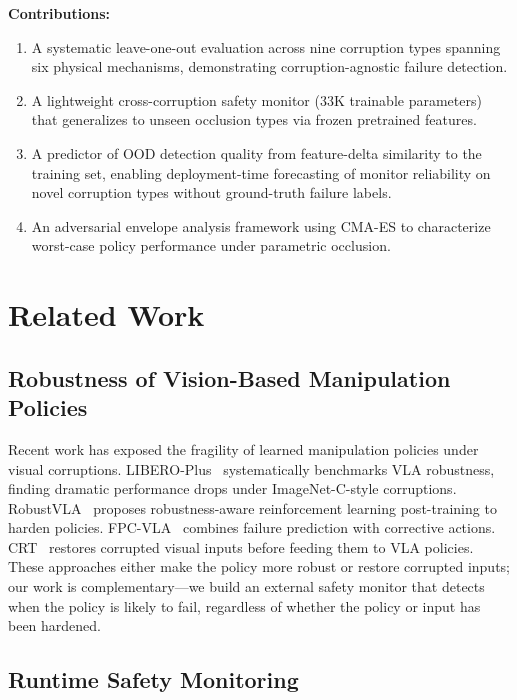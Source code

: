 \documentclass[letterpaper]{IEEEtran}
\begin{document}
\noindent\textbf{Contributions:}
\begin{enumerate}
    \item A systematic leave-one-out evaluation across nine corruption types spanning six physical mechanisms, demonstrating corruption-agnostic failure detection.
    \item A lightweight cross-corruption safety monitor (33K trainable parameters) that generalizes to unseen occlusion types via frozen pretrained features.
    \item A predictor of OOD detection quality from feature-delta similarity to the training set, enabling deployment-time forecasting of monitor reliability on novel corruption types without ground-truth failure labels.
    \item An adversarial envelope analysis framework using CMA-ES to characterize worst-case policy performance under parametric occlusion.
\end{enumerate}

\section{Related Work}
\label{sec:related}

\subsection{Robustness of Vision-Based Manipulation Policies}

Recent work has exposed the fragility of learned manipulation policies under visual corruptions.
LIBERO-Plus~\cite{liberoplus} systematically benchmarks VLA robustness, finding dramatic performance drops under ImageNet-C-style corruptions.
RobustVLA~\cite{robustvla} proposes robustness-aware reinforcement learning post-training to harden policies.
FPC-VLA~\cite{fpcvla} combines failure prediction with corrective actions.
CRT~\cite{crt} restores corrupted visual inputs before feeding them to VLA policies.
These approaches either make the policy more robust or restore corrupted inputs; our work is complementary---we build an external safety monitor that detects when the policy is likely to fail, regardless of whether the policy or input has been hardened.

\subsection{Runtime Safety Monitoring}
\end{document}
